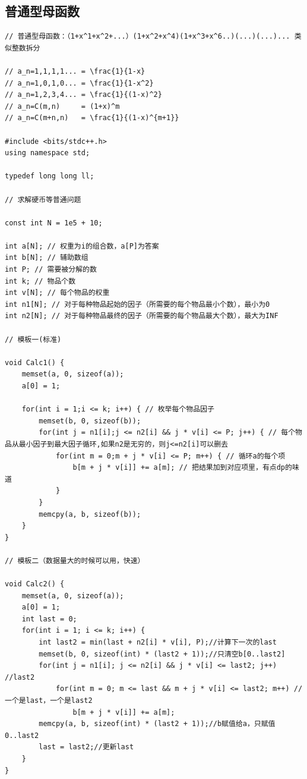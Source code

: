 \documentclass[twoside]{article}
\begin{document}
\subsection{普通型母函数}
\begin{lstlisting}
// 普通型母函数：（1+x^1+x^2+...）(1+x^2+x^4)(1+x^3+x^6..)(...)(...)... 类似整数拆分

// a_n=1,1,1,1... = \frac{1}{1-x}
// a_n=1,0,1,0... = \frac{1}{1-x^2}
// a_n=1,2,3,4... = \frac{1}{(1-x)^2}
// a_n=C(m,n)     = (1+x)^m
// a_n=C(m+n,n)   = \frac{1}{(1-x)^{m+1}}

#include <bits/stdc++.h>
using namespace std;

typedef long long ll;

// 求解硬币等普通问题

const int N = 1e5 + 10;

int a[N]; // 权重为i的组合数，a[P]为答案
int b[N]; // 辅助数组
int P; // 需要被分解的数
int k; // 物品个数
int v[N]; // 每个物品的权重
int n1[N]; // 对于每种物品起始的因子（所需要的每个物品最小个数），最小为0
int n2[N]; // 对于每种物品最终的因子（所需要的每个物品最大个数），最大为INF

// 模板一(标准)

void Calc1() {
    memset(a, 0, sizeof(a));
    a[0] = 1;

    for(int i = 1;i <= k; i++) { // 枚举每个物品因子
        memset(b, 0, sizeof(b));
        for(int j = n1[i];j <= n2[i] && j * v[i] <= P; j++) { // 每个物品从最小因子到最大因子循环,如果n2是无穷的，则j<=n2[i]可以删去
            for(int m = 0;m + j * v[i] <= P; m++) { // 循环a的每个项
                b[m + j * v[i]] += a[m]; // 把结果加到对应项里，有点dp的味道
            }
        }
        memcpy(a, b, sizeof(b));
    }
}

// 模板二（数据量大的时候可以用，快速）

void Calc2() {
    memset(a, 0, sizeof(a));
    a[0] = 1;
    int last = 0;
    for(int i = 1; i <= k; i++) {
        int last2 = min(last + n2[i] * v[i], P);//计算下一次的last
        memset(b, 0, sizeof(int) * (last2 + 1));//只清空b[0..last2]
        for(int j = n1[i]; j <= n2[i] && j * v[i] <= last2; j++) //last2
            for(int m = 0; m <= last && m + j * v[i] <= last2; m++) //一个是last，一个是last2
                b[m + j * v[i]] += a[m];
        memcpy(a, b, sizeof(int) * (last2 + 1));//b赋值给a，只赋值0..last2
        last = last2;//更新last
    }
}
\end{lstlisting}
\end{document}
